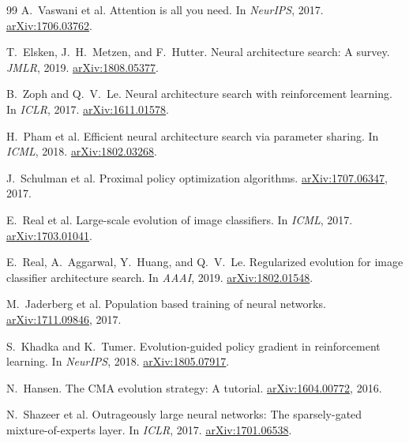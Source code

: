 \documentclass[10pt,twocolumn,letterpaper]{article}
\theoremstyle{remark}
\begin{document}
{\begin{thebibliography}{99}
A.~Vaswani et al.
\newblock Attention is all you need.
\newblock In \emph{NeurIPS}, 2017.
\newblock \href{https://arxiv.org/abs/1706.03762}{arXiv:1706.03762}.

T.~Elsken, J.~H.~Metzen, and F.~Hutter.
\newblock Neural architecture search: A survey.
\newblock \emph{JMLR}, 2019.
\newblock \href{https://arxiv.org/abs/1808.05377}{arXiv:1808.05377}.

B.~Zoph and Q.~V.~Le.
\newblock Neural architecture search with reinforcement learning.
\newblock In \emph{ICLR}, 2017.
\newblock \href{https://arxiv.org/abs/1611.01578}{arXiv:1611.01578}.

H.~Pham et al.
\newblock Efficient neural architecture search via parameter sharing.
\newblock In \emph{ICML}, 2018.
\newblock \href{https://arxiv.org/abs/1802.03268}{arXiv:1802.03268}.

J.~Schulman et al.
\newblock Proximal policy optimization algorithms.
\newblock \href{https://arxiv.org/abs/1707.06347}{arXiv:1707.06347}, 2017.

E.~Real et al.
\newblock Large-scale evolution of image classifiers.
\newblock In \emph{ICML}, 2017.
\newblock \href{https://arxiv.org/abs/1703.01041}{arXiv:1703.01041}.

E.~Real, A.~Aggarwal, Y.~Huang, and Q.~V.~Le.
\newblock Regularized evolution for image classifier architecture search.
\newblock In \emph{AAAI}, 2019.
\newblock \href{https://arxiv.org/abs/1802.01548}{arXiv:1802.01548}.

M.~Jaderberg et al.
\newblock Population based training of neural networks.
\newblock \href{https://arxiv.org/abs/1711.09846}{arXiv:1711.09846}, 2017.

S.~Khadka and K.~Tumer.
\newblock Evolution-guided policy gradient in reinforcement learning.
\newblock In \emph{NeurIPS}, 2018.
\newblock \href{https://arxiv.org/abs/1805.07917}{arXiv:1805.07917}.

N.~Hansen.
\newblock The CMA evolution strategy: A tutorial.
\newblock \href{https://arxiv.org/abs/1604.00772}{arXiv:1604.00772}, 2016.

N.~Shazeer et al.
\newblock Outrageously large neural networks: The sparsely-gated mixture-of-experts layer.
\newblock In \emph{ICLR}, 2017.
\newblock \href{https://arxiv.org/abs/1701.06538}{arXiv:1701.06538}.


\end{thebibliography}}
\end{document}
